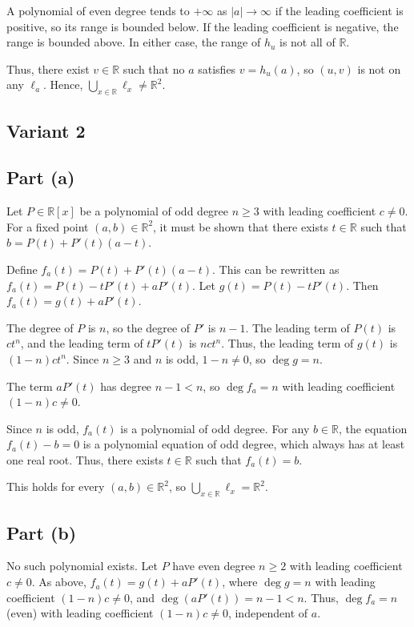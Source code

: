 \documentclass[12pt,a4paper]{article}
\theoremstyle{definition}
\begin{document}
    A polynomial of even degree tends to $+\infty$ as $|a| \to \infty$ if the leading coefficient is positive, so its range is bounded below. If the leading coefficient is negative, the range is bounded above. In either case, the range of $h_u$ is not all of $\mathbb{R}$.

    Thus, there exist $v \in \mathbb{R}$ such that no $a$ satisfies $v = h_u(a)$, so $(u, v)$ is not on any $\ell_a$. Hence, $\bigcup_{x \in \mathbb{R}} \ell_x \neq \mathbb{R}^2$.

\subsection{Variant 2}
    \subsection*{Part (a)}

    Let $P \in \mathbb{R}[x]$ be a polynomial of odd degree $n \geq 3$ with leading coefficient $c \neq 0$. For a fixed point $(a, b) \in \mathbb{R}^2$, it must be shown that there exists $t \in \mathbb{R}$ such that $b = P(t) + P'(t)(a - t)$.

    Define $f_a(t) = P(t) + P'(t)(a - t)$. This can be rewritten as $f_a(t) = P(t) - t P'(t) + a P'(t)$. Let $g(t) = P(t) - t P'(t)$. Then $f_a(t) = g(t) + a P'(t)$.

    The degree of $P$ is $n$, so the degree of $P'$ is $n-1$. The leading term of $P(t)$ is $c t^n$, and the leading term of $t P'(t)$ is $n c t^n$. Thus, the leading term of $g(t)$ is $(1 - n) c t^n$. Since $n \geq 3$ and $n$ is odd, $1 - n \neq 0$, so $\deg g = n$.

    The term $a P'(t)$ has degree $n-1 < n$, so $\deg f_a = n$ with leading coefficient $(1 - n) c \neq 0$.

    Since $n$ is odd, $f_a(t)$ is a polynomial of odd degree. For any $b \in \mathbb{R}$, the equation $f_a(t) - b = 0$ is a polynomial equation of odd degree, which always has at least one real root. Thus, there exists $t \in \mathbb{R}$ such that $f_a(t) = b$.

    This holds for every $(a, b) \in \mathbb{R}^2$, so $\bigcup_{x \in \mathbb{R}} \ell_x = \mathbb{R}^2$.

    \subsection*{Part (b)}

    No such polynomial exists. Let $P$ have even degree $n \geq 2$ with leading coefficient $c \neq 0$. As above, $f_a(t) = g(t) + a P'(t)$, where $\deg g = n$ with leading coefficient $(1 - n) c \neq 0$, and $\deg (a P'(t)) = n-1 < n$. Thus, $\deg f_a = n$ (even) with leading coefficient $(1 - n) c \neq 0$, independent of $a$.
\end{document}
